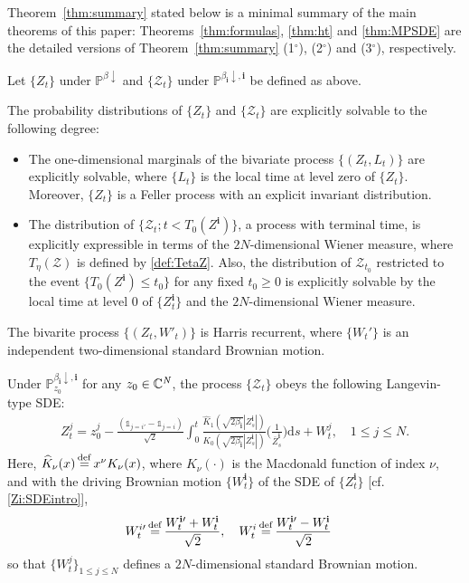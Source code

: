 \documentclass[12pt, twoside]{article}
\numberwithin{figure}{section}
\newcommand{\1}{\mathds 1}
\newcommand{\da}{{\downarrow}}
\newcommand{\ms}{\mathscr}
\renewcommand{\P}{{\mathbb P}}
\renewcommand{\d}{{\mathrm d}}
\newcommand{\2}{{\mathbf 1}}
\newcommand{\defeq}{{\stackrel{\rm def}{=}}}
\newcommand{\cc}{{^\circ}}
\newcommand{\bi}{\mathbf i}
\newcommand{\hK}{{\widehat{K}}}
\newcommand{\two}{{\sqrt{2}}}
\newcommand{\CN}{{\mathbb C}^{\it N}}
\begin{document}
Theorem~\ref{thm:summary} stated below is a minimal summary of the main theorems of this paper: Theorems~\ref{thm:formulas}, \ref{thm:ht} and \ref{thm:MPSDE} are the detailed versions of Theorem~\ref{thm:summary} (1$\cc$), (2$\cc$) and (3$\cc$), respectively. 

\begin{thm}\label{thm:summary}
Let $\{Z_t\}$ under $\P^{\beta\da}$ and $\{\ms Z_t\}$ under $\P^{\beta_\bi\da,\bi}$ be defined as above. \smallskip 

\noindent {\rm (1$\cc$)} The probability distributions of  $\{Z_t\}$ and $\{\ms Z_t\}$ are explicitly solvable to the following degree:
\begin{itemize}
\item The one-dimensional marginals of the bivariate process $\{(Z_t,L_t)\}$ are explicitly solvable, where $\{L_t\}$ is the local time at level zero of $\{Z_t\}$. Moreover, $\{Z_t\}$ is a Feller process with an explicit invariant distribution. 
\item The distribution of $\{\ms Z_t;t<T_0(Z^\bi)\}$, a process with terminal time, is explicitly expressible in terms of the $2N$-dimensional Wiener measure, where $T_\eta(\mathcal Z)$ is defined by \eqref{def:TetaZ}. Also, the distribution of $\ms Z_{t_0}$ restricted to the event $\{T_0(Z^\bi)\leq t_0\}$ for any fixed $t_0\geq 0$ is explicitly solvable by the local time at level $0$ of $\{Z^\bi_t\}$ and the $2N$-dimensional Wiener measure. 
\end{itemize}
\smallskip  

 \noindent {\rm (2$\cc$)} The bivarite process $\{(Z_t,W'_t)\}$ is Harris recurrent, where $\{W_t'\}$ is an independent two-dimensional standard Brownian motion. \smallskip 
 
\noindent {\rm (3$\cc$)} Under $\P_{z_0}^{\beta_\bi\da,\bi}$ for any $z_0\in \CN$, the process $\{\ms Z_t\}$ obeys the following Langevin-type SDE:
\begin{align}\label{def:ZSDE2intro}
Z^j_t=
 z_0^{j}-\frac{(\1_{j=i\prime}-\1_{j=i})}{\two}\int_0^t \frac{\hK_1(\sqrt{2\beta_\bi}|Z^\bi_s|)}{ K_0(\sqrt{2\beta_\bi}|Z^\bi_s|)}\biggl(\frac{1}{ \overline{Z}^\bi_s}\biggr)\d s+W^{j}_t,\quad 1\leq j\leq N.
\end{align}
Here, $\widehat{K}_\nu(x)\,\defeq\, x^\nu K_\nu(x)$, where $K_\nu(\cdot)$ is the Macdonald function of index $\nu$, and with the driving Brownian motion $\{W^\bi_t\}$ of the SDE of $\{Z^\bi_t\}$ [cf. \eqref{Zi:SDEintro}],
\begin{align*}
W^{i\prime}_t&\,\defeq \,\frac{W^{\bi\prime}_t+W^{\bi}_t}{\two},\quad W^{i}_t\,\defeq\, \frac{W^{\bi\prime}_t-W^{\bi}_t}{\two}
\end{align*}
so that $\{W^j_t\}_{1\leq j\leq N}$ defines a $2N$-dimensional standard Brownian motion.
\end{thm}
\end{document}

